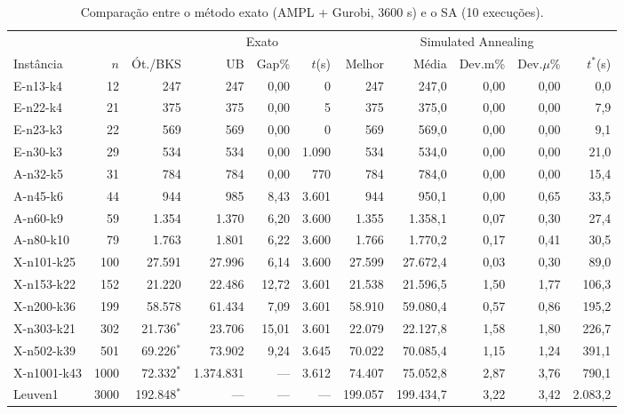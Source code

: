 \begin{table}[ht]
\centering
\scriptsize
\setlength{\tabcolsep}{3pt}
\caption{Comparação entre o método exato (AMPL + Gurobi, 3600 s) e o SA (10 execuções).}
\label{tab:comparacao}
\begin{tabular}{lrrrrrrrrrr}
\hline
 & & & \multicolumn{3}{c}{Exato} & \multicolumn{5}{c}{Simulated Annealing} \\
Instância & $n$ & Ót./BKS & UB & Gap\% & $t$(s) & Melhor & Média & Dev.m\% & Dev.$\mu$\% & $t^*$(s) \\
\hline
E-n13-k4 & 12 & 247 & 247 & 0,00 & 0 & 247 & 247,0 & 0,00 & 0,00 & 0,0 \\
E-n22-k4 & 21 & 375 & 375 & 0,00 & 5 & 375 & 375,0 & 0,00 & 0,00 & 7,9 \\
E-n23-k3 & 22 & 569 & 569 & 0,00 & 0 & 569 & 569,0 & 0,00 & 0,00 & 9,1 \\
E-n30-k3 & 29 & 534 & 534 & 0,00 & 1.090 & 534 & 534,0 & 0,00 & 0,00 & 21,0 \\
\hline
A-n32-k5 & 31 & 784 & 784 & 0,00 & 770 & 784 & 784,0 & 0,00 & 0,00 & 15,4 \\
A-n45-k6 & 44 & 944 & 985 & 8,43 & 3.601 & 944 & 950,1 & 0,00 & 0,65 & 33,5 \\
A-n60-k9 & 59 & 1.354 & 1.370 & 6,20 & 3.600 & 1.355 & 1.358,1 & 0,07 & 0,30 & 27,4 \\
A-n80-k10 & 79 & 1.763 & 1.801 & 6,22 & 3.600 & 1.766 & 1.770,2 & 0,17 & 0,41 & 30,5 \\
\hline
X-n101-k25 & 100 & 27.591 & 27.996 & 6,14 & 3.600 & 27.599 & 27.672,4 & 0,03 & 0,30 & 89,0 \\
X-n153-k22 & 152 & 21.220 & 22.486 & 12,72 & 3.601 & 21.538 & 21.596,5 & 1,50 & 1,77 & 106,3 \\
X-n200-k36 & 199 & 58.578 & 61.434 & 7,09 & 3.601 & 58.910 & 59.080,4 & 0,57 & 0,86 & 195,2 \\
\hline
X-n303-k21 & 302 & 21.736$^*$ & 23.706 & 15,01 & 3.601 & 22.079 & 22.127,8 & 1,58 & 1,80 & 226,7 \\
X-n502-k39 & 501 & 69.226$^*$ & 73.902 & 9,24 & 3.645 & 70.022 & 70.085,4 & 1,15 & 1,24 & 391,1 \\
X-n1001-k43 & 1000 & 72.332$^*$ & 1.374.831 & — & 3.612 & 74.407 & 75.052,8 & 2,87 & 3,76 & 790,1 \\
\hline
Leuven1 & 3000 & 192.848$^*$ & — & — & — & 199.057 & 199.434,7 & 3,22 & 3,42 & 2.083,2 \\
\hline
\end{tabular}
\end{table}
